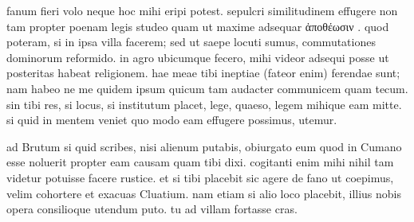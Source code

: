 


 fanum fieri volo neque hoc mihi eripi potest. sepulcri similitudinem effugere non tam propter poenam legis studeo quam ut maxime adsequar ἀποθέωσιν . quod poteram, si in ipsa villa facerem; sed ut saepe locuti sumus, commutationes dominorum reformido. in agro ubicumque fecero, mihi videor adsequi posse ut posteritas habeat religionem. hae meae tibi ineptiae (fateor enim) ferendae sunt; nam habeo ne me quidem ipsum quicum tam audacter communicem quam tecum. sin tibi res, si locus, si institutum placet, lege, quaeso, legem mihique eam mitte. si quid in mentem veniet quo modo eam effugere possimus, utemur.

 ad Brutum si quid scribes, nisi alienum putabis, obiurgato eum quod in Cumano esse noluerit propter eam causam quam tibi dixi. cogitanti enim mihi nihil tam videtur potuisse facere rustice. et si tibi placebit sic agere de fano ut coepimus, velim cohortere et exacuas Cluatium. nam etiam si alio loco placebit, illius nobis opera consilioque utendum puto. tu ad villam fortasse cras.
